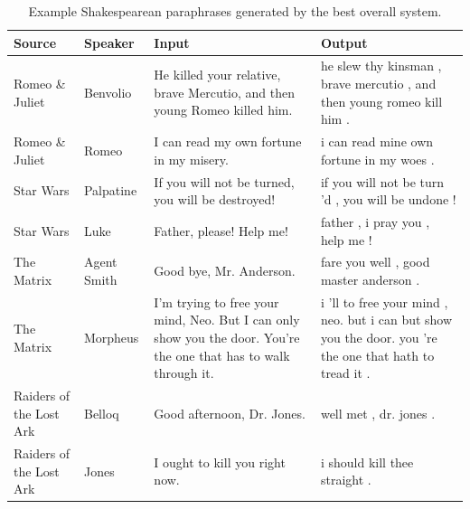 \documentclass[10pt,a5paper,twoside]{article}
\begin{document}
\begin{table}[ht]
  \begin{center}
    \begin{tabular}{|l|l|p{1.4in}|p{1.4in}|}
      \hline
      Source & Speaker & Input & Output \\
      \hline
      \hline
      Romeo \& Juliet & Benvolio & He killed your relative, brave Mercutio, and then young Romeo killed him. & he slew thy kinsman , brave mercutio , and then young romeo kill him . \\
      \hline
      Romeo \& Juliet & Romeo & I can read my own fortune in my misery. & i can read mine own fortune in my woes . \\
      \hline
      Star Wars & Palpatine & If you will not be turned, you will be destroyed! & if you will not be turn 'd , you will be undone ! \\
      \hline
      Star Wars & Luke & Father, please! Help me! & father , i pray you , help me ! \\    
      \hline
      The Matrix & Agent Smith & Good bye, Mr. Anderson. & fare you well , good master anderson . \\
      \hline
      The Matrix & Morpheus & I'm trying to free your mind, Neo. But I can only show you the door. You're the one that has to walk through it. & i 'll to free your mind , neo. but i can but show you the door. you 're the one that hath to tread it . \\
      \hline
      Raiders of the Lost Ark & Belloq & Good afternoon, Dr. Jones. & well met , dr. jones . \\
      \hline
      Raiders of the Lost Ark & Jones & I ought to kill you right now. & i should kill thee straight . \\
      \hline
    \end{tabular}
  \end{center}
  \caption{Example Shakespearean paraphrases generated by the best overall system.}
  \label{examples}
\end{table}
\end{document}
